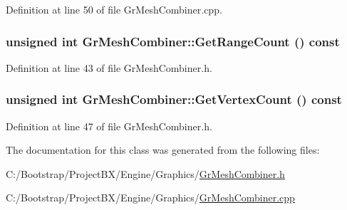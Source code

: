 Definition at line 50 of file GrMeshCombiner.cpp.\hypertarget{class_gr_mesh_combiner_1d2955c0b2ff844c687ec467a713e1bd}{
\subsubsection[{GetRangeCount}]{\setlength{\rightskip}{0pt plus 5cm}unsigned int GrMeshCombiner::GetRangeCount () const}}
\label{class_gr_mesh_combiner_1d2955c0b2ff844c687ec467a713e1bd}




Definition at line 43 of file GrMeshCombiner.h.\hypertarget{class_gr_mesh_combiner_f5879bfc1bcd54c7e5ce7e7d73a3f4f5}{
\subsubsection[{GetVertexCount}]{\setlength{\rightskip}{0pt plus 5cm}unsigned int GrMeshCombiner::GetVertexCount () const}}
\label{class_gr_mesh_combiner_f5879bfc1bcd54c7e5ce7e7d73a3f4f5}




Definition at line 47 of file GrMeshCombiner.h.

The documentation for this class was generated from the following files:\begin{CompactItemize}
\item 
C:/Bootstrap/ProjectBX/Engine/Graphics/\hyperlink{_gr_mesh_combiner_8h}{GrMeshCombiner.h}\item 
C:/Bootstrap/ProjectBX/Engine/Graphics/\hyperlink{_gr_mesh_combiner_8cpp}{GrMeshCombiner.cpp}\end{CompactItemize}
